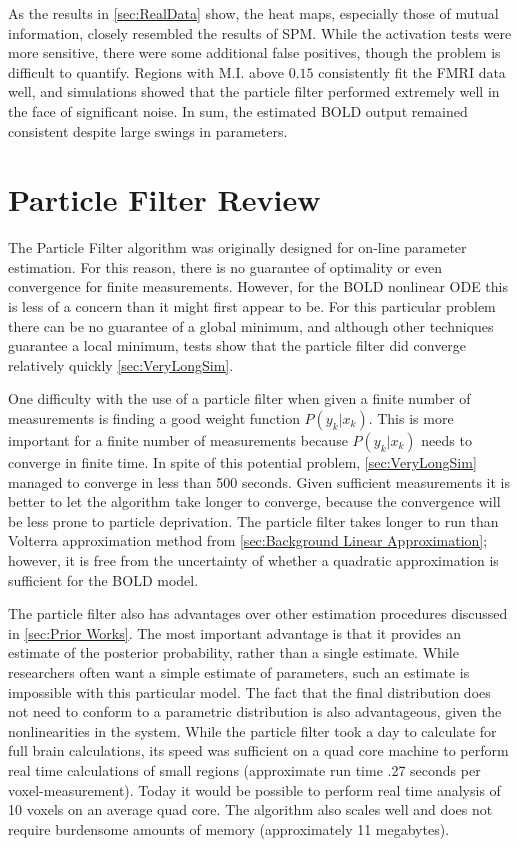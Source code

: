 As the results in \autoref{sec:RealData} show, the heat maps, especially
those of mutual information, closely resembled the results of SPM. While the activation
tests were more sensitive, there were some additional false positives,
though the problem is difficult to quantify. Regions with M.I. above
$0.15$ consistently fit the FMRI data well, and simulations showed that
the particle filter performed extremely well in the face of significant
noise. In sum, the estimated BOLD output remained consistent despite
large swings in parameters.

\section{Particle Filter Review}
The Particle Filter algorithm was originally designed for on-line parameter
estimation. For this reason, there is no guarantee of optimality or even
convergence for finite measurements. However, for the BOLD nonlinear ODE
this is less of a concern than it might first appear to be. For this
particular problem there can be no guarantee of a global minimum, and although
other techniques guarantee a local minimum, tests show that the particle
filter did converge relatively quickly \autoref{sec:VeryLongSim}.

One difficulty
with the use of a particle filter when given a finite number of measurements is finding
a good weight function $P(y_k | x_k)$. This is more important for a finite
number of measurements because $P(y_k | x_k)$ needs to converge in finite time.
In spite of this potential problem, \autoref{sec:VeryLongSim} managed
to converge in less than 500 seconds.  Given sufficient
measurements it is better to let the algorithm take longer to converge, because the
convergence will be less prone to particle deprivation. The particle filter takes longer
to run than Volterra approximation method from \autoref{sec:Background Linear Approximation};
however, it is free from the uncertainty of whether a quadratic approximation is
sufficient for the BOLD model.

The particle filter also has advantages over other estimation procedures
discussed in \autoref{sec:Prior Works}. The most important advantage is that it provides
an estimate of the posterior probability, rather than a single estimate. While researchers
often want a simple estimate of parameters, such an estimate is impossible with this particular
model. The fact that the final distribution does not need to conform to a
parametric distribution is also advantageous, given the nonlinearities in the system.
While the particle filter took a day to calculate for full brain calculations, its speed
was sufficient on a quad core machine to perform real time calculations of small regions
(approximate run time .27 seconds per voxel-measurement). Today it would be possible
 to perform real time analysis of 10 voxels on an average quad core. The algorithm also scales
well and does not require burdensome amounts of memory (approximately 11 megabytes).


